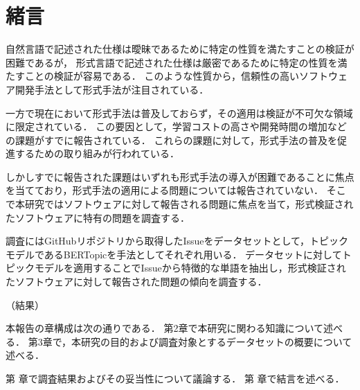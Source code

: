 \documentclass[main]{subfiles}
\begin{document}
\chapter{緒言}




自然言語で記述された仕様は曖昧であるために特定の性質を満たすことの検証が困難であるが，
形式言語で記述された仕様は厳密であるために特定の性質を満たすことの検証が容易である．
このような性質から，信頼性の高いソフトウェア開発手法として形式手法が注目されている\cite{aoki_2018}．

一方で現在において形式手法は普及しておらず，その適用は検証が不可欠な領域に限定されている．
この要因として，学習コストの高さや開発時間の増加などの課題がすでに報告されている\cite{reid_2020}．
これらの課題に対して，形式手法の普及を促進するための取り組みが行われている\cite{huisman_2022,ohnishi_2020}．

しかしすでに報告された課題はいずれも形式手法の導入が困難であることに焦点を当てており，形式手法の適用による問題については報告されていない．
そこで本研究ではソフトウェアに対して報告される問題に焦点を当て，形式検証されたソフトウェアに特有の問題を調査する．

調査にはGitHubリポジトリから取得したIssueをデータセットとして，トピックモデルであるBERTopic\cite{bertopic}を手法としてそれぞれ用いる．
データセットに対してトピックモデルを適用することでIssueから特徴的な単語を抽出し，形式検証されたソフトウェアに対して報告された問題の傾向を調査する．

（結果）

本報告の章構成は次の通りである．
第2章で本研究に関わる知識について述べる．
第3章で，本研究の目的および調査対象とするデータセットの概要について述べる．

第 章で調査結果およびその妥当性について議論する．
第 章で結言を述べる．
\end{document}
